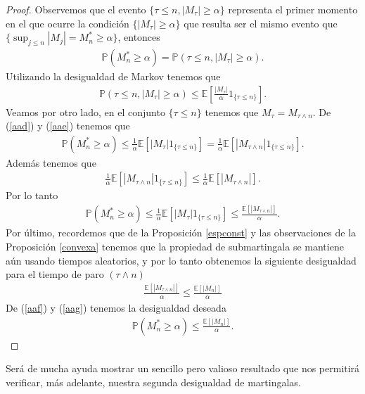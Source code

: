 \begin{proof}
	Observemos que el evento $\{ \tau \leq n, |M_{\tau}| \geq \alpha\}$ representa el primer momento en el que ocurre la condición $\{|M_{\tau}| \geq \alpha\}$ que resulta ser el mismo evento que $\{\sup_{j \leq n} |M_j| = M_n^{*} \geq \alpha\}$, entonces
	\begin{align}
		\mathbb{P}(M_n^{*} \geq \alpha) = \mathbb{P}(\tau \leq n, |M_{\tau}| \geq \alpha). \label{aad}
	\end{align}
Utilizando la desigualdad de Markov tenemos que 
	\begin{align}
		\mathbb{P}(\tau \leq n, |M_{\tau}| \geq \alpha) \leq \mathbb{E} \left[\frac{|M_{\tau}|}{\alpha}  1_{\{\tau \leq n\}} \right]. \label{aae}
	\end{align}
Veamos por otro lado, en el conjunto $\{ \tau \leq n\}$ tenemos que $M_{\tau} = M_{\tau \wedge n}$. De (\ref{aad}) y (\ref{aae}) tenemos que
	\begin{align*}
		\mathbb{P}(M_n^{*} \geq \alpha) \leq \frac{1}{\alpha} \mathbb{E}[|M_{\tau}|  1_{\{\tau \leq n\}}] = \frac{1}{\alpha} \mathbb{E}[|M_{\tau \wedge n}|  1_{\{\tau \leq n\}}].
	\end{align*}
Además tenemos que 
	\begin{align*}
		\frac{1}{\alpha} \mathbb{E}[|M_{\tau \wedge n}|  1_{\{\tau \leq n\}}] \leq \frac{1}{\alpha} \mathbb{E}[|M_{\tau \wedge n}|].
	\end{align*}
Por lo tanto
	\begin{align}
		\mathbb{P}(M_n^{*} \geq \alpha) \leq \frac{1}{\alpha} \mathbb{E}[|M_{\tau}|  1_{\{\tau \leq n\}}] \leq \frac{\mathbb{E}[|M_{\tau \wedge n}|]}{\alpha}. \label{aaf}
	\end{align}
	Por último, recordemos que de la Proposición \ref{espconst} y las observaciones de la Proposición \ref{convexa} tenemos que la propiedad de submartingala se mantiene aún usando tiempos aleatorios, y por lo tanto obtenemos la siguiente desigualdad para el tiempo de paro $(\tau \wedge n)$
	\begin{align}
		\frac{\mathbb{E}[|M_{\tau \wedge n}|]}{\alpha} \leq \frac{\mathbb{E}[|M_{n}|]}{\alpha} \label{aag}
	\end{align}
	De (\ref{aaf}) y (\ref{aag}) tenemos la desigualdad deseada
	\begin{align*}
		\mathbb{P}(M_n^{*} \geq \alpha) \leq \frac{\mathbb{E}[|M_{n}|]}{\alpha}.
	\end{align*}
\end{proof}

Será de mucha ayuda mostrar un sencillo pero valioso resultado que nos permitirá verificar, más adelante, nuestra segunda desigualdad de martingalas.

